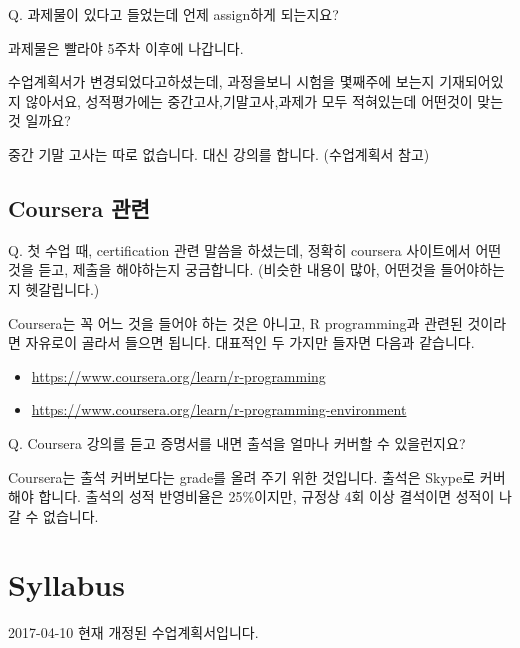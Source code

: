 \documentclass[10pt,]{krantz}
\providecommand{\tightlist}{%
  \setlength{\itemsep}{0pt}\setlength{\parskip}{0pt}}
\renewenvironment{quote}{\begin{VF}}{\end{VF}}
\begin{document}
\begin{quote}
Q. 과제물이 있다고 들었는데 언제 assign하게 되는지요?
\end{quote}

과제물은 빨라야 5주차 이후에 나갑니다.

\begin{quote}
수업계획서가 변경되었다고하셨는데, 과정을보니 시험을 몇째주에 보는지
기재되어있지 않아서요, 성적평가에는 중간고사,기말고사,과제가 모두
적혀있는데 어떤것이 맞는 것 일까요?
\end{quote}

중간 기말 고사는 따로 없습니다. 대신 강의를 합니다. (수업계획서 참고)

\subsection*{Coursera 관련}\label{coursera-}


\begin{quote}
Q. 첫 수업 때, certification 관련 말씀을 하셨는데, 정확히 coursera
사이트에서 어떤 것을 듣고, 제출을 해야하는지 궁금합니다. (비슷한 내용이
많아, 어떤것을 들어야하는지 헷갈립니다.) 
\end{quote}

Coursera는 꼭 어느 것을 들어야 하는 것은 아니고, R programming과 관련된
것이라면 자유로이 골라서 들으면 됩니다. 대표적인 두 가지만 들자면 다음과
같습니다.

\begin{itemize}
\tightlist
\item
  \url{https://www.coursera.org/learn/r-programming}
\item
  \url{https://www.coursera.org/learn/r-programming-environment}
\end{itemize}

\begin{quote}
Q. Coursera 강의를 듣고 증명서를 내면 출석을 얼마나 커버할 수
있을런지요?
\end{quote}

Coursera는 출석 커버보다는 grade를 올려 주기 위한 것입니다. 출석은
Skype로 커버해야 합니다. 출석의 성적 반영비율은 25\%이지만, 규정상 4회
이상 결석이면 성적이 나갈 수 없습니다.

\section*{Syllabus}\label{syllabus}


2017-04-10 현재 개정된 수업계획서입니다.
\end{document}
